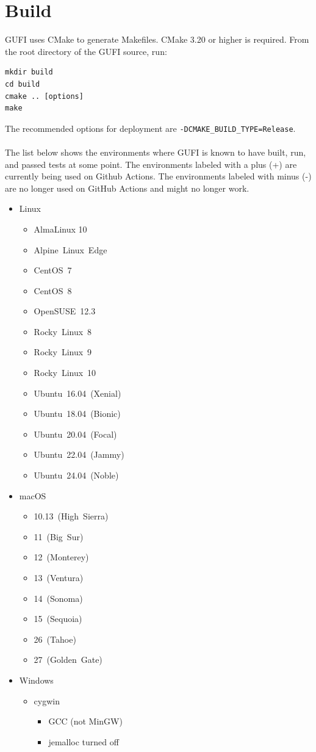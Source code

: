 \section{Build}

GUFI uses CMake to generate Makefiles. CMake 3.20 or higher is
required. From the root directory of the GUFI source, run:
\begin{verbatim}
mkdir build
cd build
cmake .. [options]
make
\end{verbatim}

The recommended options for deployment are
\texttt{-DCMAKE\_BUILD\_TYPE=Release}.
\\\\
The list below shows the environments where GUFI is known to have
built, run, and passed tests at some point. The environments labeled
with a plus (+) are currently being used on Github Actions. The
environments labeled with minus (-) are no longer used on GitHub
Actions and might no longer work.
\begin{itemize}
\item Linux
  \begin{itemize}
  \item[+] AlmaLinux 10
  \item[+] Alpine~Linux~Edge
  \item[-] CentOS~7
  \item[-] CentOS~8
  \item[-] OpenSUSE~12.3
  \item[-] Rocky~Linux~8
  \item[+] Rocky~Linux~9
  \item[+] Rocky~Linux~10
  \item[-] Ubuntu~16.04~(Xenial)
  \item[-] Ubuntu~18.04~(Bionic)
  \item[-] Ubuntu~20.04~(Focal)
  \item[+] Ubuntu~22.04~(Jammy)
  \item[+] Ubuntu~24.04~(Noble)
  \end{itemize}
\item macOS
  \begin{itemize}
  \item[-] 10.13~(High~Sierra)
  \item[-] 11~(Big~Sur)
  \item[-] 12~(Monterey)
  \item[-] 13~(Ventura)
  \item[-] 14~(Sonoma)
  \item[+] 15~(Sequoia)
  \item[+] 26~(Tahoe)
  \item[+] 27~(Golden~Gate)
  \end{itemize}
\item Windows
  \begin{itemize}
  \item[+] cygwin
    \begin{itemize}
    \item GCC (not MinGW)
    \item jemalloc turned off
    \end{itemize}
  \end{itemize}
\end{itemize}

